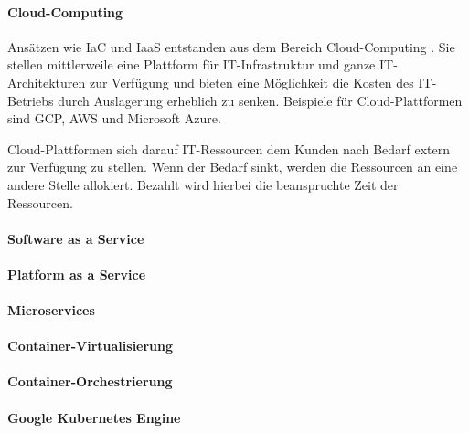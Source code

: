 \paragraph{Cloud-Computing}
Ansätzen wie \ac{IaC} und \ac{IaaS} entstanden aus dem Bereich Cloud-Computing \cite{Alt2017}. Sie stellen mittlerweile eine Plattform für IT-Infrastruktur und ganze IT-Architekturen zur Verfügung und bieten eine Möglichkeit die Kosten des IT-Betriebs durch Auslagerung erheblich zu senken. Beispiele für Cloud-Plattformen sind \ac{GCP}, \ac{AWS} und Microsoft Azure.

Cloud-Plattformen sich darauf IT-Ressourcen dem Kunden nach Bedarf extern zur Verfügung zu stellen. Wenn der Bedarf sinkt, werden die Ressourcen an eine andere Stelle allokiert. Bezahlt wird hierbei die beanspruchte Zeit der Ressourcen. 


\paragraph{Software as a Service}

\paragraph{Platform as a Service}

\paragraph{Microservices}

\paragraph{Container-Virtualisierung}

\paragraph{Container-Orchestrierung}

\paragraph{Google Kubernetes Engine}


